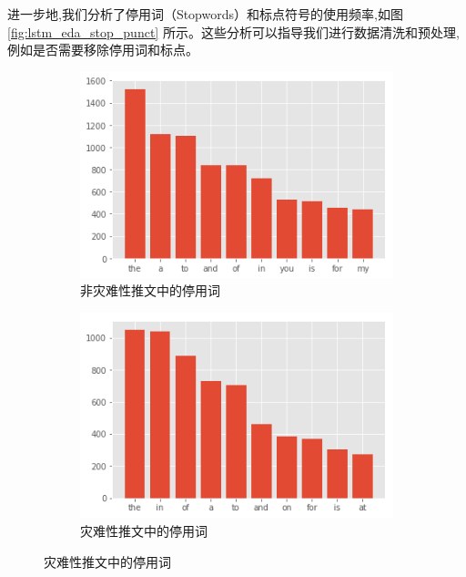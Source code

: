 进一步地,我们分析了停用词（Stopwords）和标点符号的使用频率,如图 \ref{fig:lstm_eda_stop_punct} 所示。这些分析可以指导我们进行数据清洗和预处理,例如是否需要移除停用词和标点。
\begin{figure}[htbp]
    \centering
    \begin{subfigure}[b]{0.48\textwidth}
        \centering
        \includegraphics[width=\textwidth]{figures/LSTM5.png}
        \caption{非灾难性推文中的停用词}
        \label{fig:stopword_non_disaster}
    \end{subfigure}
    \hfill
    \begin{subfigure}[b]{0.48\textwidth}
        \centering
        \includegraphics[width=\textwidth]{figures/LSTM6.png}
        \caption{灾难性推文中的停用词}
        \label{fig:stopword_disaster}
    \end{subfigure}
    
    \vspace{1cm}
    

\end{figure}
